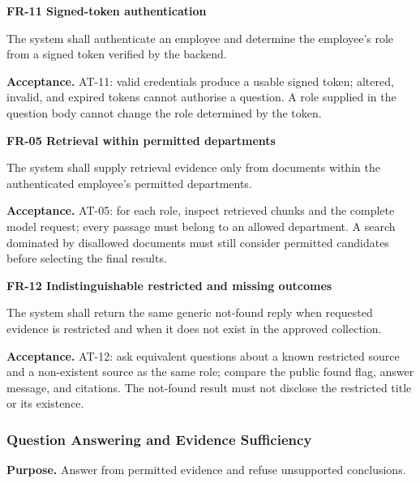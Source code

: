 \documentclass[11pt,letterpaper]{article}
\begin{document}
\textbf{FR-11 Signed-token authentication}\par

The system shall authenticate an employee and determine the employee's role from a signed token verified by the backend.\par

\textbf{Acceptance.} AT-11: valid credentials produce a usable signed token; altered, invalid, and expired tokens cannot authorise a question. A role supplied in the question body cannot change the role determined by the token.\par


\textbf{FR-05 Retrieval within permitted departments}\par

The system shall supply retrieval evidence only from documents within the authenticated employee's permitted departments.\par

\textbf{Acceptance.} AT-05: for each role, inspect retrieved chunks and the complete model request; every passage must belong to an allowed department. A search dominated by disallowed documents must still consider permitted candidates before selecting the final results.\par


\textbf{FR-12 Indistinguishable restricted and missing outcomes}\par

The system shall return the same generic not-found reply when requested evidence is restricted and when it does not exist in the approved collection.\par

\textbf{Acceptance.} AT-12: ask equivalent questions about a known restricted source and a non-existent source as the same role; compare the public found flag, answer message, and citations. The not-found result must not disclose the restricted title or its existence.\par

\subsubsection{Question Answering and Evidence Sufficiency}

\textbf{Purpose.} Answer from permitted evidence and refuse unsupported conclusions.\par
\end{document}
